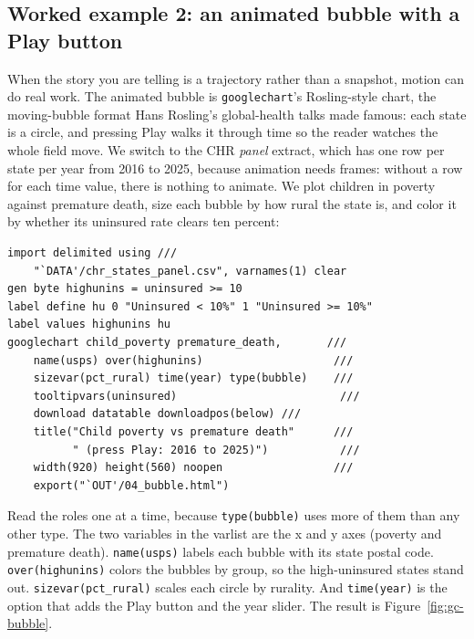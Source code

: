 \documentclass[
    a4paper,
    fontsize=10pt,
    twoside=true,
    numbers=noenddot,
]{kaobook}
\begin{document}
\subsection{Worked example 2: an animated bubble with a Play button}\label{sec:gc-bubble}
When the story you are telling is a trajectory rather than a snapshot, motion can do real work. The animated bubble is \texttt{googlechart}'s Rosling-style chart, the moving-bubble format Hans Rosling's global-health talks made famous: each state is a circle, and pressing Play walks it through time so the reader watches the whole field move. We switch to the CHR \emph{panel} extract, which has one row per state per year from 2016 to 2025, because animation needs frames: without a row for each time value, there is nothing to animate. We plot children in poverty against premature death, size each bubble by how rural the state is, and color it by whether its uninsured rate clears ten percent:
\par
{\footnotesize
\begin{verbatim}
import delimited using ///
    "`DATA'/chr_states_panel.csv", varnames(1) clear
gen byte highunins = uninsured >= 10
label define hu 0 "Uninsured < 10%" 1 "Uninsured >= 10%"
label values highunins hu
googlechart child_poverty premature_death,       ///
    name(usps) over(highunins)                    ///
    sizevar(pct_rural) time(year) type(bubble)    ///
    tooltipvars(uninsured)                         ///
    download datatable downloadpos(below) ///
    title("Child poverty vs premature death"      ///
          " (press Play: 2016 to 2025)")           ///
    width(920) height(560) noopen                 ///
    export("`OUT'/04_bubble.html")
\end{verbatim}
}
Read the roles one at a time, because \texttt{type(bubble)} uses more of them than any other type. The two variables in the varlist are the x and y axes (poverty and premature death). \texttt{name(usps)} labels each bubble with its state postal code. \texttt{over(highunins)} colors the bubbles by group, so the high-uninsured states stand out. \texttt{sizevar(pct\_rural)} scales each circle by rurality. And \texttt{time(year)} is the option that adds the Play button and the year slider. The result is Figure~\ref{fig:gc-bubble}.
\end{document}
